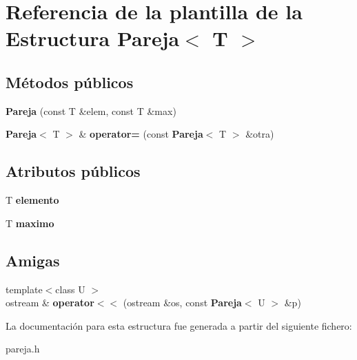 \section{Referencia de la plantilla de la Estructura Pareja$<$ T $>$}
\label{structPareja}
\subsection*{Métodos públicos}
\begin{DoxyCompactItemize}
\item 
\mbox{\label{structPareja_aa4fc53a53cb6d55f92aa8548efad5347}} 
{\bfseries Pareja} (const T \&elem, const T \&max)
\item 
\mbox{\label{structPareja_ae1d453413e936f7f401f903e5faef948}} 
\textbf{ Pareja}$<$ T $>$ \& {\bfseries operator=} (const \textbf{ Pareja}$<$ T $>$ \&otra)
\end{DoxyCompactItemize}
\subsection*{Atributos públicos}
\begin{DoxyCompactItemize}
\item 
\mbox{\label{structPareja_afa9d6dba83a1c784b35a9b4cb137156e}} 
T {\bfseries elemento}
\item 
\mbox{\label{structPareja_a6257ef13aafd987c1dbb009ae6233672}} 
T {\bfseries maximo}
\end{DoxyCompactItemize}
\subsection*{Amigas}
\begin{DoxyCompactItemize}
\item 
\mbox{\label{structPareja_a72e8f0ce7bc1ee5dbfbcebb06791cc76}} 
{\footnotesize template$<$class U $>$ }\\ostream \& {\bfseries operator$<$$<$} (ostream \&os, const \textbf{ Pareja}$<$ U $>$ \&p)
\end{DoxyCompactItemize}


La documentación para esta estructura fue generada a partir del siguiente fichero\+:\begin{DoxyCompactItemize}
\item 
pareja.\+h\end{DoxyCompactItemize}
